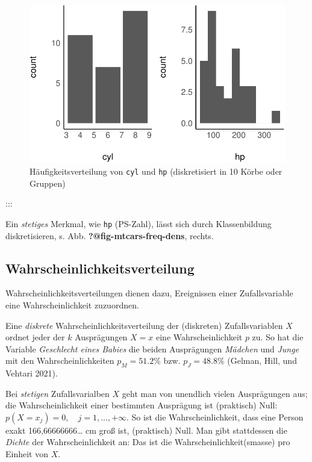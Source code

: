 \documentclass[
  a4paper,
  DIV=11]{scrreprt}
\theoremstyle{definition}
\theoremstyle{remark}
\begin{document}
\begin{figure}

{\centering \includegraphics{./Verteilungen_files/figure-pdf/fig-mtcars-freq-1.pdf}

}

\caption{\label{fig-mtcars-freq}Häufigkeitsverteilung von \texttt{cyl}
und \texttt{hp} (diskretisiert in 10 Körbe oder Gruppen)}

\end{figure}

:::

Ein \emph{stetiges} Merkmal, wie \texttt{hp} (PS-Zahl), lässt sich durch
Klassenbildung diskretisieren, s. Abb. \textbf{?@fig-mtcars-freq-dens},
rechts.

\hypertarget{wahrscheinlichkeitsverteilung}{%
\subsection{Wahrscheinlichkeitsverteilung}\label{wahrscheinlichkeitsverteilung}}

Wahrscheinlichkeitsverteilungen dienen dazu, Ereignissen einer
Zufallsvariable eine Wahrscheinlichkeit zuzuordnen.

Eine \emph{diskrete} Wahrscheinlichkeitsverteilung der (diskreten)
Zufallsvariablen \(X\) ordnet jeder der \(k\) Ausprägungen \(X=x\) eine
Wahrscheinlichkeit \(p\) zu. So hat die Variable \emph{Geschlecht eines
Babies} die beiden Ausprägungen \emph{Mädchen} und \emph{Junge} mit den
Wahrscheinlichkeiten \(p_M = 51.2\%\) bzw. \(p_J = 48.8\%\) (Gelman,
Hill, und Vehtari 2021).

Bei \emph{stetigen} Zufallsvarialben \(X\) geht man von unendlich vielen
Ausprägungen aus; die Wahrscheinlichkeit einer bestimmten Ausprägung ist
(praktisch) Null: \(p(X=x_j)=0, \quad j=1,...,+\infty\). So ist die
Wahrscheinlichkeit, dass eine Person exakt 166,66666666\ldots{} cm groß
ist, (praktisch) Null. Man gibt stattdessen die \emph{Dichte} der
Wahrscheinlichkeit an: Das ist die Wahrscheinlichkeit(smasse) pro
Einheit von \(X\).
\end{document}
